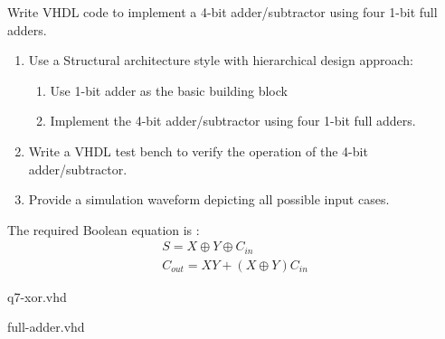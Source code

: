 \documentclass{article}
\begin{document}



\begin{Q}
    {
        Write VHDL code to implement a 4-bit adder/subtractor using four 1-bit full
        adders.
        \begin{enumerate}
            \item    Use a Structural architecture style with hierarchical design approach:
                  \begin{enumerate}
                      \item  Use 1-bit adder as the basic building block
                      \item Implement the 4-bit adder/subtractor using four 1-bit full adders.
                  \end{enumerate}
            \item  Write a VHDL test bench to verify the operation of the   4-bit adder/subtractor.
            \item Provide a simulation waveform depicting all possible input cases.
        \end{enumerate}
    }
\end{Q}


The required Boolean equation is :
\begin{align*}
    S=X \oplus Y \oplus  C_{in} \\
    C_{out}=XY + (X \oplus  Y) C_{in}
\end{align*}


\HRule
{} {q7-xor.vhd}
\HRule

\HRule
{} {full-adder.vhd}
\HRule
\end{document}
